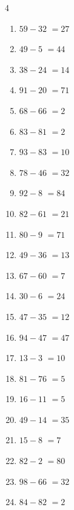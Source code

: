 \begin{multicols}{4}
\begin{enumerate}
  \item $59-32$
        $=27$

  \item $49-5$
        $=44$

  \item $38-24$
        $=14$

  \item $91-20$
        $=71$

  \item $68-66$
        $=2$

  \item $83-81$
        $=2$

  \item $93-83$
        $=10$

  \item $78-46$
        $=32$

  \item $92-8$
        $=84$

  \item $82-61$
        $=21$

  \item $80-9$
        $=71$

  \item $49-36$
        $=13$

  \item $67-60$
        $=7$

  \item $30-6$
        $=24$

  \item $47-35$
        $=12$

  \item $94-47$
        $=47$

  \item $13-3$
        $=10$

  \item $81-76$
        $=5$

  \item $16-11$
        $=5$

  \item $49-14$
        $=35$

  \item $15-8$
        $=7$

  \item $82-2$
        $=80$

  \item $98-66$
        $=32$

  \item $84-82$
        $=2$


\end{enumerate}
\end{multicols}
